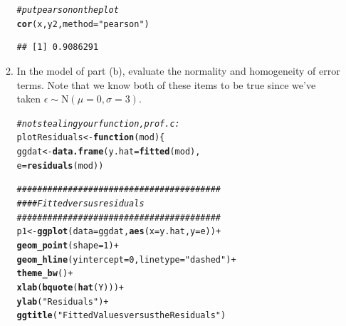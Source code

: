 \documentclass{article}\usepackage[]{graphicx}\usepackage[]{color}
\makeatletter
\newcommand{\hlnum}[1]{\textcolor[rgb]{0.686,0.059,0.569}{#1}}%
\newcommand{\hlstr}[1]{\textcolor[rgb]{0.192,0.494,0.8}{#1}}%
\newcommand{\hlcom}[1]{\textcolor[rgb]{0.678,0.584,0.686}{\textit{#1}}}%
\newcommand{\hlopt}[1]{\textcolor[rgb]{0,0,0}{#1}}%
\newcommand{\hlstd}[1]{\textcolor[rgb]{0.345,0.345,0.345}{#1}}%
\newcommand{\hlkwa}[1]{\textcolor[rgb]{0.161,0.373,0.58}{\textbf{#1}}}%
\newcommand{\hlkwb}[1]{\textcolor[rgb]{0.69,0.353,0.396}{#1}}%
\newcommand{\hlkwc}[1]{\textcolor[rgb]{0.333,0.667,0.333}{#1}}%
\newcommand{\hlkwd}[1]{\textcolor[rgb]{0.737,0.353,0.396}{\textbf{#1}}}%
\newenvironment{kframe}{%
 \def\at@end@of@kframe{}%
 \ifinner\ifhmode%
  \def\at@end@of@kframe{\end{minipage}}%
  \begin{minipage}{\columnwidth}%
 \fi\fi%
 \def\FrameCommand##1{\hskip\@totalleftmargin \hskip-\fboxsep
 \colorbox{shadecolor}{##1}\hskip-\fboxsep
     \hskip-\linewidth \hskip-\@totalleftmargin \hskip\columnwidth}%
 \MakeFramed {\advance\hsize-\width
   \@totalleftmargin\z@ \linewidth\hsize
   \@setminipage}}%
 {\par\unskip\endMakeFramed%
 \at@end@of@kframe}
\newenvironment{knitrout}{}{} %
\makeatother
\begin{document}
\begin{enumerate}
\begin{enumerate}
\begin{knitrout}
\begin{kframe}\begin{alltt}
  \hlcom{#put pearson on the plot}
\hlkwd{cor}\hlstd{(x, y2,} \hlkwc{method}\hlstd{=}\hlstr{"pearson"}\hlstd{)}
\end{alltt}
\begin{verbatim}
## [1] 0.9086291
\end{verbatim}
\end{kframe}
\end{knitrout}
  \item In the model of part (b), evaluate the normality and homogeneity of error terms. Note 
  that we know both of these items to be true since we've taken $\epsilon \sim 
  \textrm{N}(\mu=0,\sigma=3)$.
\begin{knitrout}
\color{fgcolor}\begin{kframe}
\begin{alltt}
\hlcom{#not stealing your function, prof. c:}
\hlstd{plotResiduals}\hlkwb{<-}\hlkwa{function}\hlstd{(}\hlkwc{mod}\hlstd{)\{}
  \hlstd{ggdat} \hlkwb{<-} \hlkwd{data.frame}\hlstd{(}\hlkwc{y.hat} \hlstd{=} \hlkwd{fitted}\hlstd{(mod),}
                      \hlkwc{e} \hlstd{=} \hlkwd{residuals}\hlstd{(mod))}

  \hlcom{########################################}
  \hlcom{####  Fitted versus residuals}
  \hlcom{########################################}
  \hlstd{p1}\hlkwb{<-}\hlkwd{ggplot}\hlstd{(}\hlkwc{data}\hlstd{=ggdat,}\hlkwd{aes}\hlstd{(}\hlkwc{x}\hlstd{=y.hat,}\hlkwc{y}\hlstd{=e))}\hlopt{+}
    \hlkwd{geom_point}\hlstd{(}\hlkwc{shape}\hlstd{=}\hlnum{1}\hlstd{)}\hlopt{+}
    \hlkwd{geom_hline}\hlstd{(}\hlkwc{yintercept}\hlstd{=}\hlnum{0}\hlstd{,}\hlkwc{linetype}\hlstd{=}\hlstr{"dashed"}\hlstd{)}\hlopt{+}
    \hlkwd{theme_bw}\hlstd{()}\hlopt{+}
    \hlkwd{xlab}\hlstd{(}\hlkwd{bquote}\hlstd{(}\hlkwd{hat}\hlstd{(Y)))}\hlopt{+}
    \hlkwd{ylab}\hlstd{(}\hlstr{"Residuals"}\hlstd{)}\hlopt{+}
    \hlkwd{ggtitle}\hlstd{(}\hlstr{"Fitted Values versus the Residuals"}\hlstd{)}


\end{alltt}
\end{kframe}
\end{knitrout}
\end{enumerate}
\end{enumerate}
\end{document}
